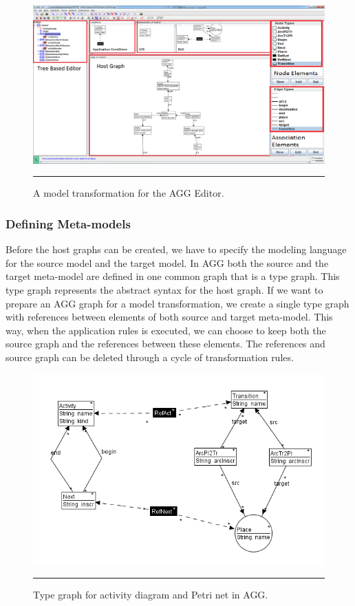 \begin{figure}[H]
  \centering
    \includegraphics[scale=0.3]{figures/AGGscreen.png}
    \rule{35em}{0.5pt}
  \caption[Graphical Editor for AGG]
  {A model transformation for the AGG Editor.}
  \label{fig:AGGScreen}
\end{figure}

\subsubsection*{Defining Meta-models}

Before the host graphs can be created, we have to specify the modeling language
for the source model and the target model. In AGG both the source and the
target meta-model are defined in one common graph that is a type graph. This
type graph represents the abstract syntax for the host graph. If we want to prepare an AGG
graph for a model transformation, we create a single type graph with references
between elements of both source and target meta-model. This way, when the
application rules is executed, we can choose to keep both the source graph and
the references between these elements. The references and source graph can be
deleted through a cycle of transformation rules.

\begin{figure}[H]
	\centering
	\includegraphics[scale=0.7]{figures/AggTypeGraph.png}
	\rule{35em}{0.5pt}
	\caption[Type graph in AGG]
	{Type graph for activity diagram and Petri net in AGG.}
	\label{fig:AggTypeGraph}
\end{figure}


